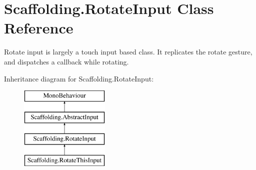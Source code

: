 \hypertarget{class_scaffolding_1_1_rotate_input}{\section{Scaffolding.\-Rotate\-Input Class Reference}
\label{class_scaffolding_1_1_rotate_input}
}


Rotate input is largely a touch input based class. It replicates the rotate gesture, and dispatches a callback while rotating.  


Inheritance diagram for Scaffolding.\-Rotate\-Input\-:\begin{figure}[H]
\begin{center}
\leavevmode
\includegraphics[height=4.000000cm]{class_scaffolding_1_1_rotate_input}
\end{center}
\end{figure}
